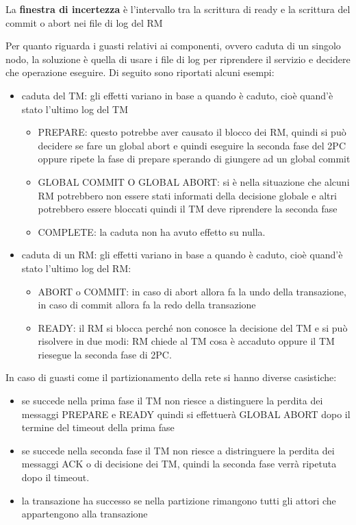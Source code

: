 \begin{nota}
    La \textbf{finestra di incertezza} è l'intervallo tra la scrittura di ready
    e la scrittura del commit o abort nei file di log del RM
\end{nota}

Per quanto riguarda i guasti relativi ai componenti, ovvero caduta di
un singolo nodo, la soluzione è quella di
usare i file di log per riprendere il servizio e decidere che operazione eseguire.
Di seguito sono riportati alcuni esempi:
\begin{itemize}
    \item caduta del TM: gli effetti variano in base a quando è caduto, cioè quand'è
          stato l'ultimo log del TM
          \begin{itemize}
              \item PREPARE: questo potrebbe aver causato il blocco dei RM, quindi si può
                    decidere se fare un global abort e quindi eseguire la seconda fase del 2PC
                    oppure ripete la fase di prepare sperando di giungere ad un global commit
              \item GLOBAL COMMIT O GLOBAL ABORT: si è nella situazione che alcuni RM potrebbero
                    non essere stati informati della decisione globale e altri potrebbero essere
                    bloccati quindi il TM deve riprendere la seconda fase
              \item COMPLETE: la caduta non ha avuto effetto su nulla.
          \end{itemize}
    \item caduta di un RM: gli effetti variano in base a quando è caduto, cioè quand'è
          stato l'ultimo log del RM:
          \begin{itemize}
              \item ABORT o COMMIT: in caso di abort allora fa la undo della transazione,
                    in caso di commit allora fa la redo della transazione
              \item READY: il RM si blocca perché non conosce la decisione del TM e si può
                    risolvere in due modi: RM chiede al TM cosa è accaduto oppure il TM riesegue la
                    seconda fase di 2PC.
          \end{itemize}
\end{itemize}

In caso di guasti come il partizionamento della rete si hanno diverse casistiche:
\begin{itemize}
    \item se succede nella prima fase il TM non riesce a distinguere la perdita 
    dei messaggi PREPARE e READY quindi si effettuerà GLOBAL ABORT dopo il termine 
    del timeout della prima fase
    \item se succede nella seconda fase il TM non riesce a distringuere la perdita 
    dei messaggi ACK o di decisione dei TM, quindi la seconda fase verrà ripetuta 
    dopo il timeout.
    \item la transazione ha successo se nella partizione rimangono tutti gli attori
    che appartengono alla transazione
\end{itemize}


